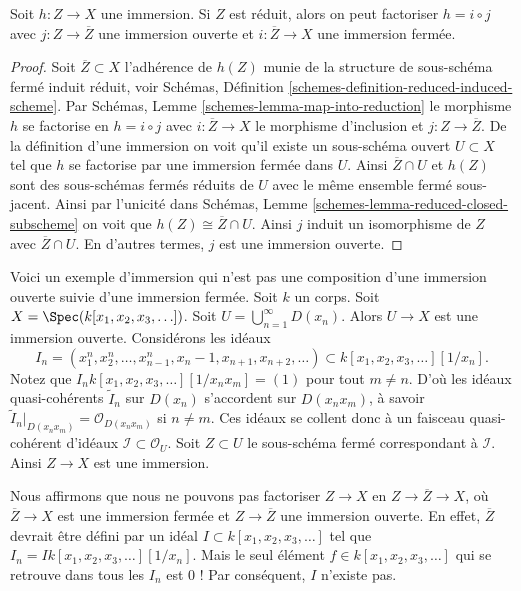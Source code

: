 \begin{lemma}
\label{lemma-factor-reduced-immersion}
Soit $h : Z \to X$ une immersion. Si
$Z$ est réduit, alors on
peut factoriser $h = i \circ j$ avec $j : Z \to \overline{Z}$ une
immersion ouverte et $i : \overline{Z} \to X$ une immersion fermée.
\end{lemma}

\begin{proof}
Soit $\overline{Z} \subset X$ l'adhérence de $h(Z)$ munie de la structure de sous-schéma
fermé induit réduit, voir
Schémas, Définition \ref{schemes-definition-reduced-induced-scheme}. Par Schémas, Lemme \ref{schemes-lemma-map-into-reduction}
le morphisme $h$ se factorise en $h = i \circ j$
avec $i : \overline{Z} \to X$
le morphisme d'inclusion et $j : Z \to \overline{Z}$. De la définition d'une
immersion on voit qu'il existe un sous-schéma ouvert
$U \subset X$ tel que $h$ se factorise par une
immersion fermée dans $U$. Ainsi $\overline{Z} \cap U$
et $h(Z)$ sont des sous-schémas fermés réduits
de $U$ avec le même ensemble fermé sous-jacent.
Ainsi par l'unicité dans Schémas, Lemme \ref{schemes-lemma-reduced-closed-subscheme}
on voit que $h(Z) \cong \overline{Z} \cap U$. Ainsi $j$ induit
un isomorphisme de $Z$ avec $\overline{Z} \cap U$. En d’autres termes,
$j$ est une immersion ouverte.
\end{proof}



\begin{example}
\label{example-thibaut}
Voici un exemple d'immersion qui n'est pas une composition d'une
immersion ouverte suivie d'une immersion
fermée. Soit
$k$ un corps. Soit $X = \Spec(k[x_1, x_2, x_3, \ldots])$.
Soit $U = \bigcup_{n = 1}^{\infty} D(x_n)$. Alors $U \to X$ est
une immersion ouverte. Considérons
les idéaux
$$
I_n =
(x_1^n, x_2^n, \ldots, x_{n - 1}^n, x_n - 1, x_{n + 1}, x_{n + 2}, \ldots)
\subset
k[x_1, x_2, x_3, \ldots][1/x_n].
$$
Notez que $I_n k[x_1, x_2, x_3, \ldots][1/x_nx_m] = (1)$ pour tout $m \not = n$. D'où
les idéaux quasi-cohérents $\widetilde I_n$
sur $D(x_n)$ s'accordent sur $D(x_nx_m)$, à
savoir $\widetilde I_n|_{D(x_nx_m)} = \mathcal{O}_{D(x_n x_m)}$ si $n \not = m$. Ces idéaux se
collent donc à un faisceau quasi-cohérent d'idéaux $\mathcal{I} \subset \mathcal{O}_U$.
Soit $Z \subset U$ le sous-schéma
fermé correspondant à $\mathcal{I}$. Ainsi
$Z \to X$ est une immersion.

\medskip\noindent
Nous affirmons que nous ne pouvons pas
factoriser $Z \to X$ en $Z \to \overline{Z} \to X$, où $\overline{Z} \to X$
est une immersion fermée et $Z \to \overline{Z}$ une immersion ouverte. En effet, $\overline{Z}$
devrait être défini par un idéal $I \subset k[x_1, x_2, x_3, \ldots]$ tel que
$I_n = I k[x_1, x_2, x_3, \ldots][1/x_n]$. Mais le seul élément $f \in k[x_1, x_2, x_3, \ldots]$
qui se retrouve dans tous les $I_n$ est $0$
! Par conséquent, $I$ n'existe pas.
\end{example}


